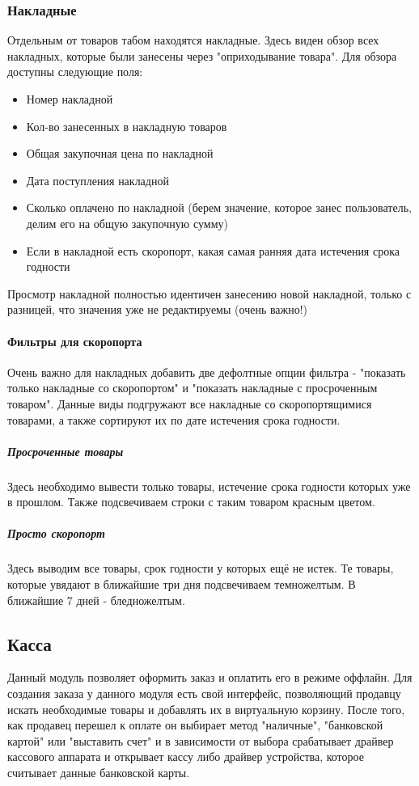 \documentclass[DIV=calc, paper=a4, fontsize=11pt]{scrartcl} %
\begin{document}
\subsubsection{Накладные}
Отдельным от товаров табом находятся накладные. Здесь виден обзор всех накладных, которые были занесены через "оприходывание товара". Для обзора доступны следующие поля:

\begin{itemize}
	\item Номер накладной
	\item Кол-во занесенных в накладную товаров
	\item Общая закупочная цена по накладной
	\item Дата поступления накладной
	\item Сколько оплачено по накладной (берем значение, которое занес пользователь, делим его на общую закупочную сумму)
	\item Если в накладной есть скоропорт, какая самая ранняя дата истечения срока годности
\end{itemize}

Просмотр накладной полностью идентичен занесению новой накладной, только с разницей, что значения уже не редактируемы (очень важно!)

\paragraph{Фильтры для скоропорта}
Очень важно для накладных добавить две дефолтные опции фильтра - "показать только накладные со скоропортом" и "показать накладные с просроченным товаром". Данные виды подгружают все накладные со скоропортящимися товарами, а также сортируют их по дате истечения срока годности. 

\subparagraph{Просроченные товары}
Здесь необходимо вывести только товары, истечение срока годности которых уже в прошлом. Также подсвечиваем строки с таким товаром красным цветом.

\subparagraph{Просто скоропорт}
Здесь выводим все товары, срок годности у которых ещё не истек. Те товары, которые увядают в ближайшие три дня подсвечиваем темножелтым. В ближайшие 7 дней - бледножелтым.

\subsection{Касса}

Данный модуль позволяет оформить заказ и оплатить его в режиме оффлайн. Для создания заказа у данного модуля есть свой интерфейс, позволяющий продавцу искать необходимые товары и добавлять их в виртуальную корзину. После того, как продавец перешел к оплате он выбирает метод "наличные", "банковской картой" или "выставить счет" и в зависимости от выбора срабатывает драйвер кассового аппарата и открывает кассу либо драйвер устройства, которое считывает данные банковской карты. 
\end{document}
